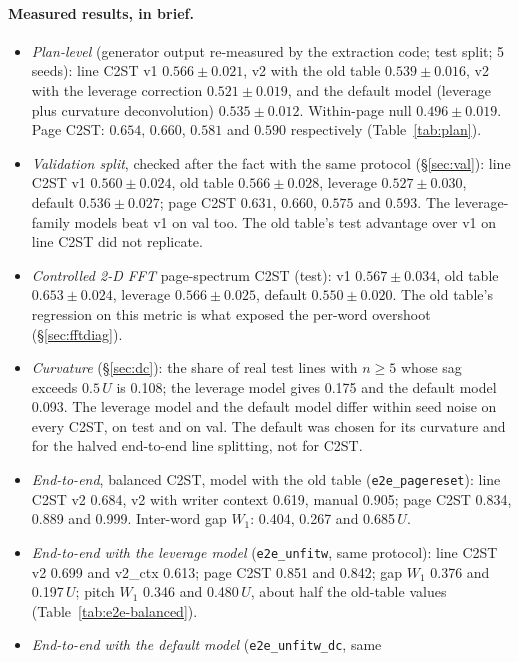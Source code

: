 \documentclass[11pt,a4paper]{article}
\newcommand{\U}{\ensuremath{U}}
\begin{document}
\paragraph{Measured results, in brief.}
\begin{itemize}
\item \emph{Plan-level} (generator output re-measured by the extraction code; test split; 5 seeds):
  line C2ST v1 $0.566\pm0.021$, v2 with the old table $0.539\pm0.016$, v2 with
  the leverage correction $0.521\pm0.019$, and the default model
  (leverage plus curvature deconvolution) $0.535\pm0.012$. Within-page null
  $0.496\pm0.019$. Page C2ST: $0.654$, $0.660$, $0.581$ and $0.590$
  respectively (Table~\ref{tab:plan}).
\item \emph{Validation split}, checked after the fact with the same protocol
  (\S\ref{sec:val}): line C2ST v1 $0.560\pm0.024$, old table $0.566\pm0.028$,
  leverage $0.527\pm0.030$, default $0.536\pm0.027$; page C2ST $0.631$,
  $0.660$, $0.575$ and $0.593$. The leverage-family models beat v1 on val too.
  The old table's test advantage over v1 on line C2ST did not replicate.
\item \emph{Controlled 2-D FFT} page-spectrum C2ST (test): v1 $0.567\pm0.034$,
  old table $0.653\pm0.024$, leverage $0.566\pm0.025$, default
  $0.550\pm0.020$. The old table's regression on this metric is what exposed
  the per-word overshoot (\S\ref{sec:fftdiag}).
\item \emph{Curvature} (\S\ref{sec:dc}): the share of real test lines with
  $n\ge5$ whose sag exceeds $0.5\,\U$ is 0.108; the leverage model gives
  0.175 and the default model 0.093. The leverage model and the default model
  differ within seed noise on every C2ST, on test and on val. The default was
  chosen for its curvature and for the halved end-to-end line splitting, not
  for C2ST.
\item \emph{End-to-end}, balanced C2ST, model with the old table
  (\texttt{e2e\_pagereset}): line C2ST v2 0.684, v2 with writer context 0.619,
  manual 0.905; page C2ST 0.834, 0.889 and 0.999. Inter-word gap $W_1$: 0.404,
  0.267 and 0.685\,\U.
\item \emph{End-to-end with the leverage model} (\texttt{e2e\_unfitw}, same
  protocol): line C2ST v2 0.699 and v2\_ctx 0.613; page C2ST 0.851 and 0.842;
  gap $W_1$ 0.376 and 0.197\,\U; pitch $W_1$ 0.346 and 0.480\,\U, about half
  the old-table values (Table~\ref{tab:e2e-balanced}).
\item \emph{End-to-end with the default model} (\texttt{e2e\_unfitw\_dc}, same

\end{itemize}
\end{document}
